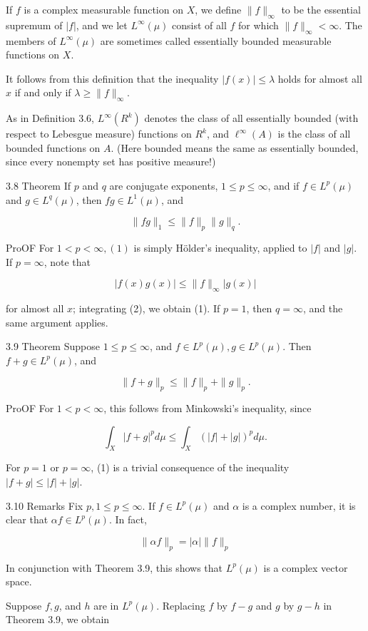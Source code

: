 \documentclass[10pt]{article}
\begin{document}
If $f$ is a complex measurable function on $X$, we define $\|f\|_{\infty}$ to be the essential supremum of $|f|$, and we let $L^{\infty}(\mu)$ consist of all $f$ for which $\|f\|_{\infty}<\infty$. The members of $L^{\infty}(\mu)$ are sometimes called essentially bounded measurable functions on $X$.

It follows from this definition that the inequality $|f(x)| \leq \lambda$ holds for almost all $x$ if and only if $\lambda \geq\|f\|_{\infty}$.

As in Definition 3.6, $L^{\infty}\left(R^{k}\right)$ denotes the class of all essentially bounded (with respect to Lebesgue measure) functions on $R^{k}$, and $\ell^{\infty}(A)$ is the class of all bounded functions on $A$. (Here bounded means the same as essentially bounded, since every nonempty set has positive measure!)

3.8 Theorem If $p$ and $q$ are conjugate exponents, $1 \leq p \leq \infty$, and if $f \in L^{p}(\mu)$ and $g \in L^{q}(\mu)$, then $f g \in L^{1}(\mu)$, and

$$
\|f g\|_{1} \leq\|f\|_{p}\|g\|_{q} .
$$

ProOF For $1<p<\infty,(1)$ is simply Hölder's inequality, applied to $|f|$ and $|g|$. If $p=\infty$, note that

$$
|f(x) g(x)| \leq\|f\|_{\infty}|g(x)|
$$

for almost all $x$; integrating (2), we obtain (1). If $p=1$, then $q=\infty$, and the same argument applies.

3.9 Theorem Suppose $1 \leq p \leq \infty$, and $f \in L^{p}(\mu), g \in L^{p}(\mu)$. Then $f+g \in L^{p}(\mu)$, and

$$
\|f+g\|_{p} \leq\|f\|_{p}+\|g\|_{p} .
$$

ProOF For $1<p<\infty$, this follows from Minkowski's inequality, since

$$
\int_{X}|f+g|^{p} d \mu \leq \int_{X}(|f|+|g|)^{p} d \mu .
$$

For $p=1$ or $p=\infty$, (1) is a trivial consequence of the inequality $|f+g| \leq|f|+|g|$.

3.10 Remarks Fix $p, 1 \leq p \leq \infty$. If $f \in L^{p}(\mu)$ and $\alpha$ is a complex number, it is clear that $\alpha f \in L^{p}(\mu)$. In fact,

$$
\|\alpha f\|_{p}=|\alpha|\|f\|_{p}
$$

In conjunction with Theorem 3.9, this shows that $L^{p}(\mu)$ is a complex vector space.

Suppose $f, g$, and $h$ are in $L^{p}(\mu)$. Replacing $f$ by $f-g$ and $g$ by $g-h$ in Theorem 3.9, we obtain
\end{document}
